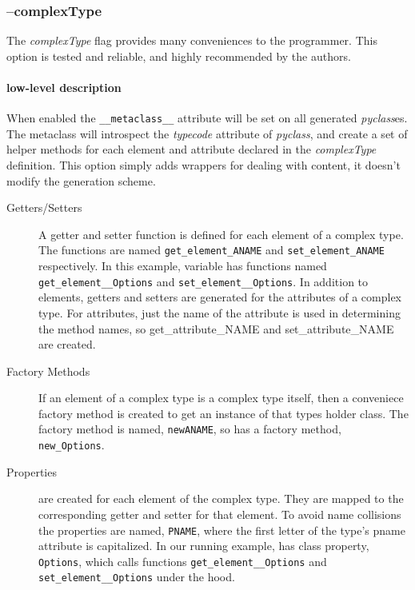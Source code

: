 \subsubsection{--complexType}
\label{subsubsection:complexType}
The {\it complexType} flag provides many conveniences to the programmer. This 
option is tested and reliable, and highly recommended by the authors.  

\paragraph{low-level description}
When enabled the \verb!__metaclass__! attribute will be set on all generated 
{\it pyclass}es.  The metaclass will introspect the {\it typecode} attribute of 
{\it pyclass}, and create a set of helper methods for each element
and attribute declared in the {\it complexType} definition.  This option simply
adds wrappers for dealing with content, it doesn't modify the generation scheme.

\begin{description}
\item[Getters/Setters] A getter and setter function is defined for each element
of a complex type.  The functions are named \verb!get_element_ANAME! and
\verb!set_element_ANAME! respectively.  In this example, variable 
has functions named \verb!get_element__Options! and \verb!set_element__Options!.
 In addition to elements, getters and setters are generated for the attributes
 of a complex type.  For attributes, just the name of the attribute is used in
 determining the method names, so get_attribute_NAME and set_attribute_NAME are
 created.

\item[Factory Methods] If an element of a complex type is a complex type itself,
then a conveniece factory method is created to get an instance of that types
holder class.  The factory method is named, \verb!newANAME!, so  has
a factory method, \verb!new_Options!.

\item[Properties]
are created for each element of the complex type.  They are mapped to the
corresponding getter and setter for that element.  To avoid name collisions the
properties are named, \verb!PNAME!, where the first letter of the type's pname
attribute is capitalized.  In our running example,  has class
property, \verb!Options!, which calls functions \verb!get_element__Options! and
\verb!set_element__Options! under the hood.

\end{description}

